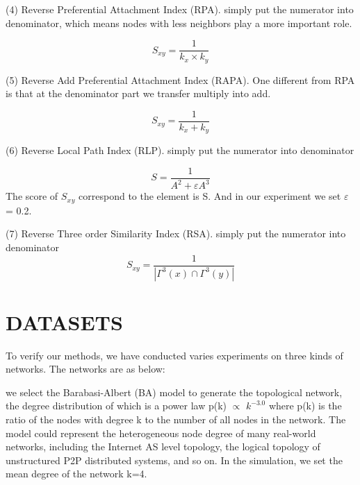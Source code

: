 \documentclass[onecolumn,preprintnumbers,amsmath,amssymb]{revtex4}
\begin{document}

(4) Reverse Preferential Attachment Index (RPA). simply put the numerator into denominator, which means nodes with less neighbors play a more important role.


\begin{equation}
S_{xy}=\frac{1}{k_x \times k_y}
\end{equation}

(5) Reverse Add Preferential Attachment Index (RAPA). One different from RPA is that at the denominator part we transfer multiply into add.


\begin{equation}
S_{xy}=\frac{1}{k_x + k_y}
\end{equation}

(6) Reverse Local Path Index (RLP). simply put the numerator into denominator

\begin{equation}
S=\frac{1}{A^2 + \varepsilon A^3}
\end{equation}
The score of $S_x$$_y$ correspond to the element is S. And in our experiment we set 
$\varepsilon$= 0.2.


(7) Reverse Three order Similarity Index (RSA). simply put the numerator into denominator
\begin{equation}
S_{xy}=\frac{1}{ |\Gamma^3(x) \cap \Gamma^3(y)|}
\end{equation}




\section*{DATASETS\protect}
To verify our methods, we have conducted varies experiments on three kinds of networks. The networks are as below:


we select the Barabasi-Albert (BA)\cite{BA} model to generate the topological network, the degree distribution of which is a power law p(k) $\propto$ $k^{-3.0}$ where p(k) is the ratio of the nodes with degree k to the number of all nodes in the network. The model could represent the heterogeneous node degree of many real-world networks, including the Internet AS level topology, the logical topology of unstructured P2P distributed systems, and so on. In the simulation, we set the mean degree of the network k=4.
\end{document}
